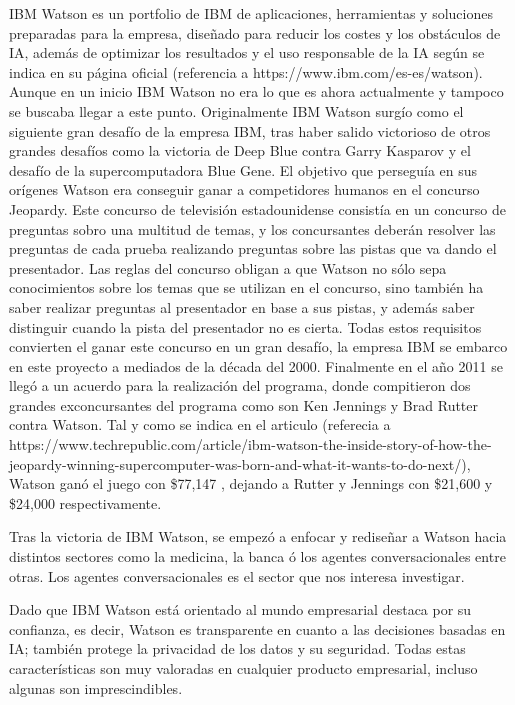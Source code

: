 IBM Watson es un portfolio de IBM de aplicaciones, herramientas y soluciones preparadas para la empresa, diseñado para reducir los costes y los obstáculos de IA, además de optimizar los resultados y el uso responsable de la IA según se indica en su página oficial (referencia a https://www.ibm.com/es-es/watson). Aunque en un inicio IBM Watson no era lo que es ahora actualmente y tampoco se buscaba llegar a este punto. Originalmente IBM Watson surgío como el siguiente gran desafío de la empresa IBM, tras haber salido victorioso de otros grandes desafíos como la victoria de Deep Blue contra Garry Kasparov y el desafío de la supercomputadora Blue Gene. El objetivo que perseguía en sus orígenes Watson era conseguir ganar a competidores humanos en el concurso Jeopardy. Este concurso de televisión estadounidense consistía en un concurso de preguntas sobro una multitud de temas, y los concursantes deberán resolver las preguntas de cada prueba realizando preguntas sobre las pistas que va dando el presentador. Las reglas del concurso obligan a que Watson no sólo sepa conocimientos sobre los temas que se utilizan en el concurso, sino también ha saber realizar preguntas al presentador en base a sus pistas, y además saber distinguir cuando la pista del presentador no es cierta. Todas estos requisitos convierten el ganar este concurso en un gran desafío, la empresa IBM se embarco en este proyecto a mediados de la década del 2000. Finalmente en el año 2011 se llegó a un acuerdo para la realización del programa, donde compitieron dos grandes exconcursantes del programa como son Ken Jennings y Brad Rutter contra Watson. Tal y como se indica en el articulo (referecia a https://www.techrepublic.com/article/ibm-watson-the-inside-story-of-how-the-jeopardy-winning-supercomputer-was-born-and-what-it-wants-to-do-next/), Watson ganó el juego con \$77,147 , dejando a Rutter y Jennings con \$21,600 y \$24,000 respectivamente.

Tras la victoria de IBM Watson, se empezó a enfocar y rediseñar a Watson hacia distintos sectores como la medicina, la banca ó los agentes conversacionales entre otras. Los agentes conversacionales es el sector que nos interesa investigar.

Dado que IBM Watson está orientado al mundo empresarial destaca por su confianza, es decir, Watson es transparente en cuanto a las decisiones basadas en IA; también protege la privacidad de los datos y su seguridad. Todas estas características son muy valoradas en cualquier producto empresarial, incluso algunas son imprescindibles.

